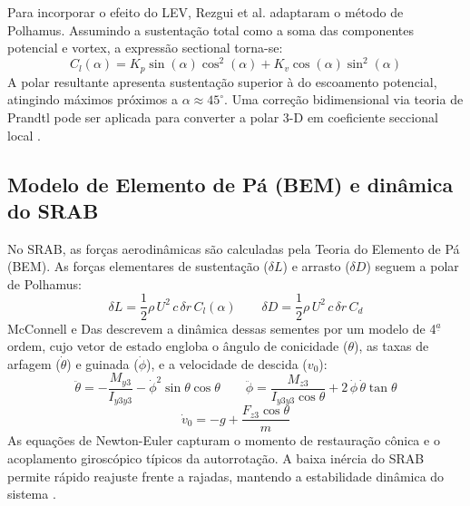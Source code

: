 Para incorporar o efeito do LEV, Rezgui et al. \citeyear{rezgui2020} adaptaram o método de Polhamus. Assumindo a sustentação total como a soma das componentes potencial e vortex, a expressão sectional torna-se:
\begin{equation}
C_l(\alpha) = K_p \sin(\alpha) \cos^2(\alpha) + K_v \cos(\alpha) \sin^2(\alpha)
\end{equation}
A polar resultante apresenta sustentação superior à do escoamento potencial, atingindo máximos próximos a $\alpha \approx 45^{\circ}$. Uma correção bidimensional via teoria de Prandtl pode ser aplicada para converter a polar 3-D em coeficiente seccional local \citep{rezgui2020}.

\subsection{Modelo de Elemento de Pá (BEM) e dinâmica do SRAB}

No SRAB, as forças aerodinâmicas são calculadas pela Teoria do Elemento de Pá (BEM). As forças elementares de sustentação ($\delta L$) e arrasto ($\delta D$) seguem a polar de Polhamus:
\begin{equation}
\delta L = \frac{1}{2} \rho \, U^2 \, c \, \delta r \, C_l(\alpha)
\qquad
\delta D = \frac{1}{2} \rho \, U^2 \, c \, \delta r \, C_d
\end{equation}
McConnell e Das \citeyear{mcconnell2023} descrevem a dinâmica dessas sementes por um modelo de 4$^{\underline{a}}$ ordem, cujo vetor de estado engloba o ângulo de conicidade ($\theta$), as taxas de arfagem ($\dot\theta$) e guinada ($\dot\phi$), e a velocidade de descida ($v_0$):
\begin{equation}
\ddot\theta = -\frac{M_{y3}}{I_{y3y3}} - \dot\phi^2 \sin\theta \cos\theta
\qquad
\ddot\phi = \frac{M_{z3}}{I_{y3y3} \cos\theta} + 2\,\dot\phi\,\dot\theta \tan\theta
\end{equation}
\begin{equation}
\dot{v}_0 = -g + \frac{F_{z3} \cos\theta}{m}
\end{equation}
As equações de Newton-Euler capturam o momento de restauração cônica e o acoplamento giroscópico típicos da autorrotação. A baixa inércia do SRAB permite rápido reajuste frente a rajadas, mantendo a estabilidade dinâmica do sistema \citep{limacher2015, mcconnell2023}.